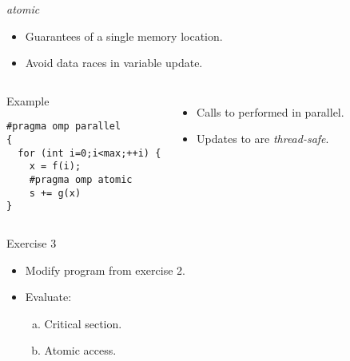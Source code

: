 \begin{frame}[t,fragile]{\emph{atomic}}
\begin{itemize}
  \item Guarantees  of a single memory location.
  \item Avoid data races in variable update.
\end{itemize}

\begin{columns}

\begin{block}{Example}
\begin{lstlisting}
#pragma omp parallel
{
  for (int i=0;i<max;++i) {
    x = f(i);
    #pragma omp atomic
    s += g(x)
}
\end{lstlisting}
\end{block}

\begin{itemize}
  \item Calls to  performed in parallel.
  \item Updates to  are \emph{thread-safe}.
\end{itemize}

\end{columns}
\end{frame}

\begin{frame}[t]{Exercise 3}
\begin{itemize}
  \item Modify program from exercise 2.
  \item Evaluate:
    \begin{enumerate}[a)]
      \item Critical section.
      \item Atomic access.
    \end{enumerate}
\end{itemize}
\end{frame}

